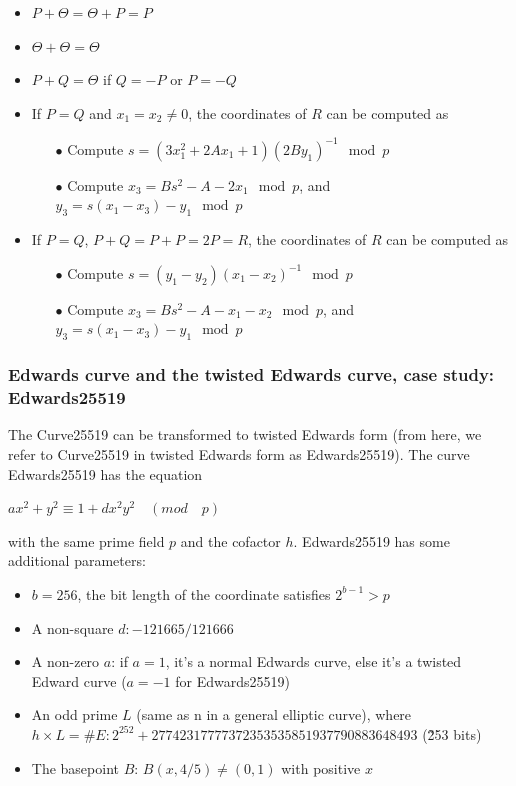 \begin{itemize}
  \item $P + \Theta = \Theta + P = P$
  \item $\Theta + \Theta = \Theta$
  \item $P + Q = \Theta$ if $Q = -P$ or $P = -Q$
  \item If $P = Q$ and $x_1 = x_2 \neq 0$, the coordinates of $R$ can be computed as

        \begin{itemize}
          \item[$\bullet$] Compute $s = (3x_1^2 + 2Ax_1 + 1) (2By_1)^{-1} \mod p$
          \item[$\bullet$] Compute $x_3 = Bs^2 - A - 2x_1 \mod p$, and $y_3 = s(x_1 - x_3) - y_1 \mod p$
        \end{itemize}

  \item If $P = Q$, $P + Q = P + P = 2P = R$, the coordinates of $R$ can be computed as

        \begin{itemize}
          \item[$\bullet$] Compute $s = (y_1 - y_2) (x_1 - x_2)^{-1} \mod p$
          \item[$\bullet$] Compute $x_3 = Bs^2 - A - x_1 - x_2 \mod p$, and $y_3 = s(x_1 - x_3) - y_1 \mod p$
        \end{itemize}
\end{itemize}

\subsubsection{Edwards curve and the twisted Edwards curve, case study: Edwards25519}

The Curve25519 can be transformed to twisted Edwards form (from here, we refer to Curve25519 in twisted Edwards form as Edwards25519). The curve Edwards25519 has the equation

\hspace{0.25cm}
\begin{center}
  $ax^2 + y^2 \equiv 1 + dx^2 y^2 \quad (mod \quad p)$
\end{center}
\hspace{0.25cm}

with the same prime field $p$ and the cofactor $h$. Edwards25519 has some additional parameters:

\begin{itemize}
  \item $b = 256$, the bit length of the coordinate satisfies $2^{b-1} > p$
  \item A non-square $d: -121665/121666$
  \item A non-zero $a$: if $a = 1$, it's a normal Edwards curve, else it's a twisted Edward curve ($a = -1$ for Edwards25519)
  \item An odd prime $L$ (same as n in a general elliptic curve), where $h \times L = \#E: 2^{252}+27742317777372353535851937790883648493$ (\~253 bits)
  \item The basepoint $B$: $B(x, 4/5) \neq (0, 1)$ with positive $x$
\end{itemize}



